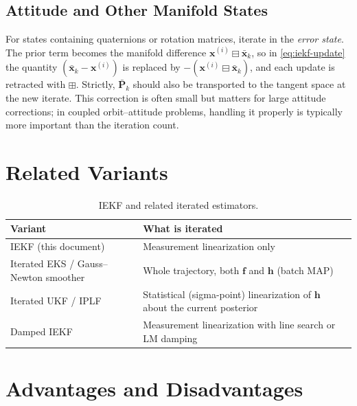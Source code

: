 \documentclass[11pt]{article}
\newcommand{\x}{\bm{x}}
\newcommand{\dyn}{\bm{f}}
\newcommand{\meas}{\bm{h}}
\newcommand{\Pm}{\bm{P}}
\newcommand{\xbar}{\bar{\x}}
\newcommand{\Pbar}{\bar{\Pm}}
\newcommand{\iter}[1]{^{(#1)}}
\begin{document}
\subsection{Attitude and Other Manifold States}

For states containing quaternions or rotation matrices, iterate in the \emph{error state}.
The prior term becomes the manifold difference $\x\iter{i} \boxminus \xbar_k$, so in
\eqref{eq:iekf-update} the quantity $(\xbar_k - \x\iter{i})$ is replaced by
$-(\x\iter{i} \boxminus \xbar_k)$, and each update is retracted with $\boxplus$.
Strictly, $\Pbar_k$ should also be transported to the tangent space at the new iterate.
This correction is often small but matters for large attitude corrections; in coupled
orbit--attitude problems, handling it properly is typically more important than the
iteration count.

\section{Related Variants}
\label{sec:variants}

\begin{table}[htbp]
\centering
\begin{tabular}{@{}lp{}@{}}
\toprule
\textbf{Variant} & \textbf{What is iterated} \\
\midrule
IEKF (this document) & Measurement linearization only \\
Iterated EKS / Gauss--Newton smoother & Whole trajectory, both $\dyn$ and $\meas$ (batch MAP) \\
Iterated UKF / IPLF & Statistical (sigma-point) linearization of $\meas$ about the current posterior \\
Damped IEKF & Measurement linearization with line search or LM damping \\
\bottomrule
\end{tabular}
\caption{IEKF and related iterated estimators.}
\end{table}

\section{Advantages and Disadvantages}
\end{document}
